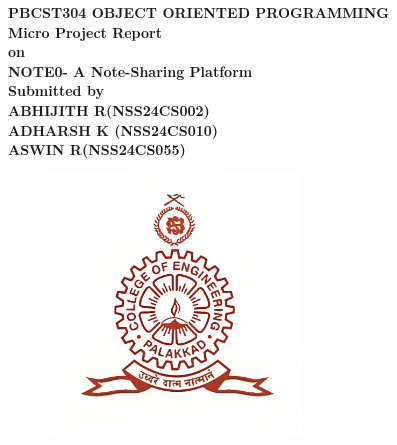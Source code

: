 \documentclass[12pt, a4paper]{report}
\begin{document}
\begin{center}
\textbf{PBCST304 OBJECT ORIENTED PROGRAMMING}\\[0.3cm]
\textbf{Micro Project Report}\\[0.3cm]
\textbf{on}\\[0.3cm]
\textbf{NOTE0- A  Note-Sharing Platform}\\[0.8cm]
\textbf{Submitted by}\\[0.3cm]
\textbf{ABHIJITH R(NSS24CS002)}\\[0.5cm]
\textbf{ADHARSH K (NSS24CS010)}\\[.5cm]
\textbf{ASWIN R(NSS24CS055)}\\[.5cm]
\end{center}
\date{Analysis Date: APRIL 21, 2025}
\begin{figure}[h] %
  \centering
  \includegraphics[width=0.6\textwidth]{images/NSS_LOGO.jpg} %
   
  
\end{figure}
\end{document}
